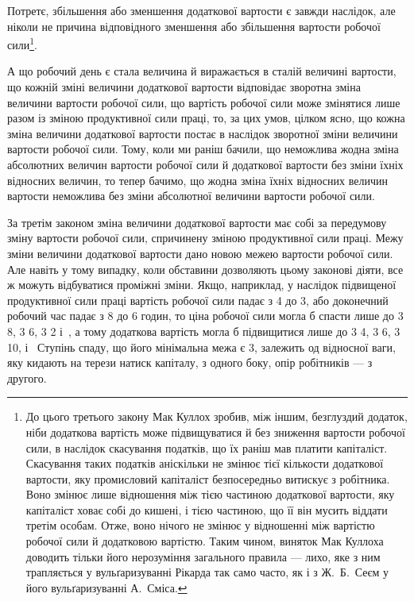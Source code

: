 Потретє, збільшення або зменшення додаткової вартости є
завжди наслідок, але ніколи не причина відповідного зменшення
або збільшення вартости робочої сили\footnote{
До цього третього закону Мак Куллох зробив, між іншим, безглуздий
додаток, ніби додаткова вартість може підвищуватися й без зниження
вартости робочої сили, в наслідок скасування податків, що їх раніш мав
платити капіталіст. Скасування таких податків аніскільки не змінює
тієї кількости додаткової вартости, яку промисловий капіталіст безпосередньо
витискує з робітника. Воно змінює лише відношення між тією
частиною додаткової вартости, яку капіталіст ховає собі до кишені, і
тією частиною, що її він мусить віддати третім особам. Отже, воно нічого не
змінює у відношенні між вартістю робочої сили й додатковою вартістю.
Таким чином, виняток Мак Куллоха доводить тільки його нерозуміння
загального правила — лихо, яке з ним трапляється у вульґаризуванні
Рікарда так само часто, як і з Ж.~Б.~Сеєм у його вульґаризуванні А.~Сміса.
}.

А що робочий день є стала величина й виражається в сталій
величині вартости, що кожній зміні величини додаткової вартости
відповідає зворотна зміна величини вартости робочої сили, що
вартість робочої сили може змінятися лише разом із зміною продуктивної
сили праці, то, за цих умов, цілком ясно, що кожна
зміна величини додаткової вартости постає в наслідок зворотної
зміни величини вартости робочої сили. Тому, коли ми раніш
бачили, що неможлива жодна зміна абсолютних величин вартости
робочої сили й додаткової вартости без зміни їхніх відносних
величин, то тепер бачимо, що жодна зміна їхніх відносних
величин вартости неможлива без зміни абсолютної величини вартости
робочої сили.

За третім законом зміна величини додаткової вартости має
собі за передумову зміну вартости робочої сили, спричинену
зміною продуктивної сили праці. Межу зміни величини додаткової
вартости дано новою межею вартости робочої сили. Але навіть
у тому випадку, коли обставини дозволяють цьому законові
діяти, все ж можуть відбуватися проміжні зміни. Якщо, наприклад,
у наслідок підвищеної продуктивної сили праці вартість
робочої сили падає з 4 до 3, або доконечний робочий час
падає з 8 до 6 годин, то ціна робочої сили могла б спасти лише до
3 8, 3 6, 3 2
і~, а тому додаткова вартість могла б підвищитися лише до
3 4, 3 6, 3 10,
і~ Ступінь спаду, що його мінімальна межа є 3,
залежить од відносної ваги, яку кидають на терези натиск капіталу,
з одного боку, опір робітників — з другого.

